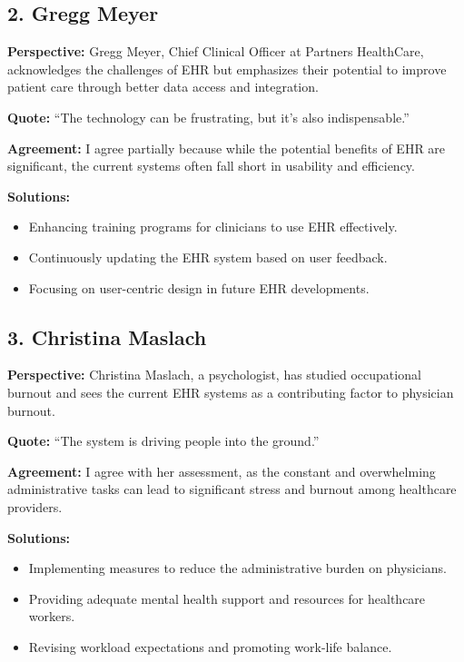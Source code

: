 \documentclass{article}
\begin{document}
\subsection*{2. Gregg Meyer}

\textbf{Perspective:} Gregg Meyer, Chief Clinical Officer at Partners HealthCare, acknowledges the challenges of EHR but emphasizes their potential to improve patient care through better data access and integration.

\textbf{Quote:} “The technology can be frustrating, but it's also indispensable.”

\textbf{Agreement:} I agree partially because while the potential benefits of EHR are significant, the current systems often fall short in usability and efficiency.

\textbf{Solutions:}
\begin{itemize}
    \item Enhancing training programs for clinicians to use EHR effectively.
    \item Continuously updating the EHR system based on user feedback.
    \item Focusing on user-centric design in future EHR developments.
\end{itemize}

\subsection*{3. Christina Maslach}

\textbf{Perspective:} Christina Maslach, a psychologist, has studied occupational burnout and sees the current EHR systems as a contributing factor to physician burnout.

\textbf{Quote:} “The system is driving people into the ground.”

\textbf{Agreement:} I agree with her assessment, as the constant and overwhelming administrative tasks can lead to significant stress and burnout among healthcare providers.

\textbf{Solutions:}
\begin{itemize}
    \item Implementing measures to reduce the administrative burden on physicians.
    \item Providing adequate mental health support and resources for healthcare workers.
    \item Revising workload expectations and promoting work-life balance.
\end{itemize}
\end{document}
